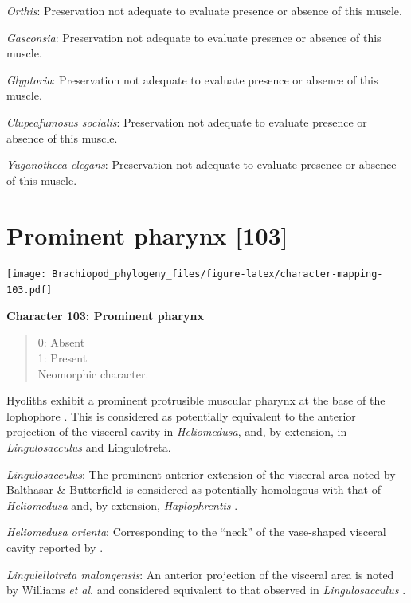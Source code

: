 \documentclass[]{book}
\theoremstyle{definition}
\theoremstyle{definition}
\theoremstyle{definition}
\theoremstyle{remark}
\begin{document}
\emph{Orthis}: Preservation not adequate to evaluate presence or absence
of this muscle.

\emph{Gasconsia}: Preservation not adequate to evaluate presence or
absence of this muscle.

\emph{Glyptoria}: Preservation not adequate to evaluate presence or
absence of this muscle.

\emph{Clupeafumosus socialis}: Preservation not adequate to evaluate
presence or absence of this muscle.

\emph{Yuganotheca elegans}: Preservation not adequate to evaluate
presence or absence of this muscle.

\hypertarget{prominent-pharynx-103}{%
\section{Prominent pharynx {[}103{]}}\label{prominent-pharynx-103}}

\texttt{[image: Brachiopod\_phylogeny\_files/figure-latex/character-mapping-103.pdf]}

\textbf{Character 103: Prominent pharynx}

\begin{quote}
0: Absent\\
1: Present\\
Neomorphic character.
\end{quote}

Hyoliths exhibit a prominent protrusible muscular pharynx at the base of
the lophophore \citep{Moysiuk2017Hyolithsare}. This is considered as
potentially equivalent to the anterior projection of the visceral cavity
in \emph{Heliomedusa}, and, by extension, in \emph{Lingulosacculus} and
Lingulotreta.

\emph{Lingulosacculus}: The prominent anterior extension of the visceral
area noted by Balthasar \& Butterfield
\citeyearpar{Balthasar2009EarlyCambrian} is considered as potentially
homologous with that of \emph{Heliomedusa}
\citep{Zhang2009Architectureand} and, by extension, \emph{Haplophrentis}
\citep{Moysiuk2017Hyolithsare}.

\emph{Heliomedusa orienta}: Corresponding to the ``neck'' of the
vase-shaped visceral cavity reported by
\citet{Zhang2009Architectureand}.

\emph{Lingulellotreta malongensis}: An anterior projection of the
visceral area is noted by Williams \emph{et al}.
\citeyearpar{Williams2000BrachiopodaLinguliformea} and considered
equivalent to that observed in \emph{Lingulosacculus}
\citep{Balthasar2009EarlyCambrian}.
\end{document}
